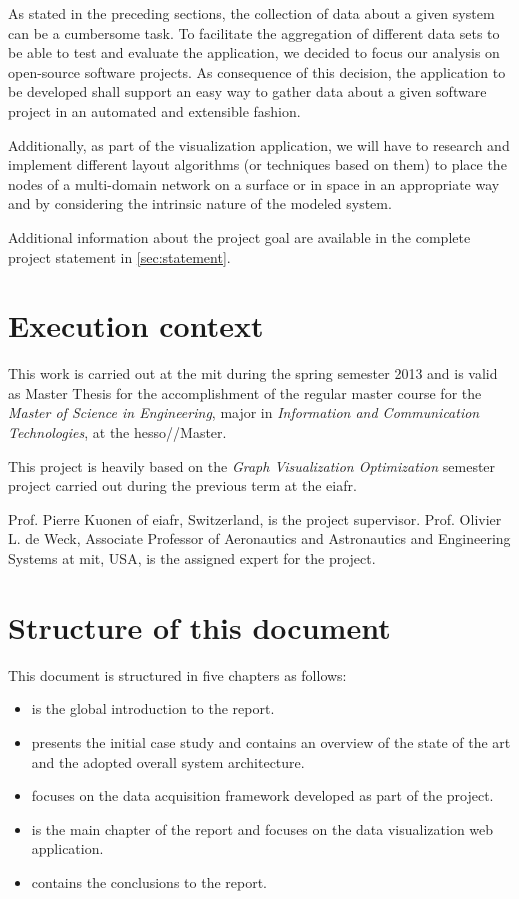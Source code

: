 As stated in the preceding sections, the collection of data about a given system can be a cumbersome task. To facilitate the aggregation of different data sets to be able to test and evaluate the application, we decided to focus our analysis on open-source software projects. As consequence of this decision, the application to be developed shall support an easy way to gather data about a given software project in an automated and extensible fashion.

Additionally, as part of the visualization application, we will have to research and implement different layout algorithms (or techniques based on them) to place the nodes of a multi-domain network on a surface or in space in an appropriate way and by considering the intrinsic nature of the modeled system.

Additional information about the project goal are available in the complete project statement in \vref{sec:statement}.

\section{Execution context}

This work is carried out at the \gls{mit} during the spring semester 2013 and is valid as Master Thesis for the accomplishment of the regular master course for the \emph{Master of Science in Engineering}, major in \emph{Information and Communication Technologies}, at the \gls{hesso}//Master.

This project is heavily based on the \emph{Graph Visualization Optimization} semester project carried out during the previous term at the \gls{eiafr}.

Prof. Pierre Kuonen of \gls{eiafr}, Switzerland, is the project supervisor. Prof. Olivier L. de Weck, Associate Professor of Aeronautics and Astronautics and Engineering Systems at \gls{mit}, USA, is the assigned expert for the project.

\section{Structure of this document}

This document is structured in five chapters as follows:

\begin{itemize}
  \item {} is the global introduction to the report.
  \item {} presents the initial case study and contains an overview of the state of the art and the adopted overall system architecture.
  \item {} focuses on the data acquisition framework developed as part of the project.
  \item {} is the main chapter of the report and focuses on the data visualization web application.
  \item {} contains the conclusions to the report.
\end{itemize}

